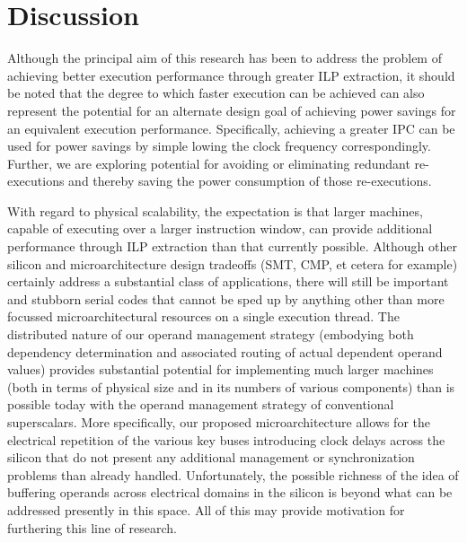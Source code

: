 %
\section{Discussion}
%
Although the principal aim of this research has been to address
the problem of achieving better execution performance through
greater ILP extraction, it should be noted that the degree to which
faster execution can be achieved can also represent the potential
for an alternate design goal of achieving power savings for
an equivalent execution performance.  Specifically, achieving
a greater IPC can be used for power savings by simple lowing
the clock frequency correspondingly.
Further, we are exploring potential for avoiding
or eliminating redundant re-executions and thereby saving the
power consumption of those re-executions.

With regard to physical scalability, 
the expectation is that larger machines, capable of executing
over a larger instruction window, can provide additional performance
through ILP extraction than that currently possible.
Although other silicon and microarchitecture design tradeoffs (SMT, CMP,
et cetera for example) certainly address a substantial class of 
applications, there will still be important and stubborn serial codes
that cannot be sped up by anything other than more focussed
microarchitectural resources on a single execution thread.
The distributed nature of
our operand management strategy (embodying both dependency determination
and associated routing of actual dependent operand values)
provides substantial potential for implementing much larger
machines (both in terms of physical size and in its numbers of various 
components) than is possible today with the operand management
strategy of conventional superscalars.
More specifically, our proposed microarchitecture allows for
the electrical repetition of the various key buses introducing clock
delays across the silicon that do not present any additional
management or synchronization problems than already handled.
Unfortunately, the possible richness of the idea of buffering 
operands across
electrical domains in the silicon is beyond what can be addressed
presently in this space.
All of this may provide motivation for furthering this line of research.
%
